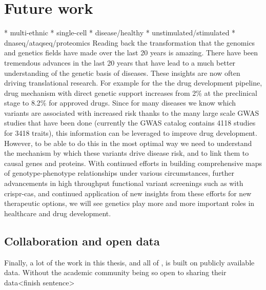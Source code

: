 \section{Future work}
* multi-ethnic
* single-cell
* disease/healthy
* unstimulated/stimulated
* dnaseq/ataqseq/proteomics
Reading back the transformation that the genomics and genetics fields have made over the last 20 years is amazing. There have been tremendous advances in the last 20 years that have lead to a much better understanding of the genetic basis of diseases. These insights are now often driving translational research. For example for the the drug development pipeline, drug mechanism with direct genetic support increases from 2\% at the preclinical stage to 8.2\% for approved drugs\cite{nelsonSupportHumanGenetic2015d}. Since for many diseases we know which variants are associated with increased risk thanks to the many large scale GWAS studies that have been done (currently the GWAS catalog\cite{macarthurNewNHGRIEBICatalog2017a} contains 4118 studies for 3418 traits), this information can be leveraged to improve drug development. However, to be able to do this in the most optimal way we need to understand the mechanism by which these variants drive disease risk, and to link them to causal genes and proteins.
With continued efforts in building comprehensive maps of genotype-phenotype relationships under various circumstances, further advancements in high throughput functional variant screenings such as with crispr-cas, and continued application of new insights from these efforts for new therapeutic options, we will see genetics play more and more important roles in healthcare and drug development. 


\subsection{Collaboration and open data}
Finally, a lot of the work in this thesis, and all of , is built on publicly available data. Without the academic community being so open to sharing their data<finish sentence> 

